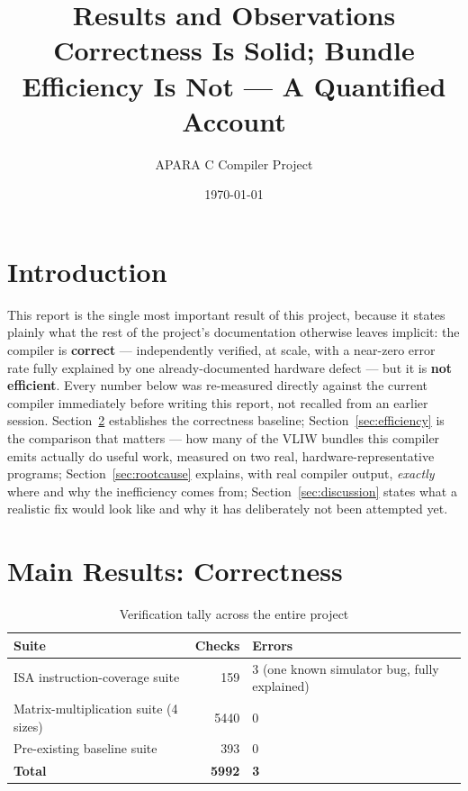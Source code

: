 \documentclass[11pt,a4paper]{article}
\title{\textbf{Results and Observations}\\[2mm]
\large Correctness Is Solid; Bundle Efficiency Is Not --- A Quantified Account}
\author{APARA C Compiler Project}
\date{\today}
\begin{document}
\maketitle
\thispagestyle{fancy}
\vspace{-8mm}

\section{Introduction}

This report is the single most important result of this project, because it states
plainly what the rest of the project's documentation otherwise leaves implicit: the
compiler is \textbf{correct} --- independently verified, at scale, with a near-zero error
rate fully explained by one already-documented hardware defect --- but it is
\textbf{not efficient}. Every number below was re-measured directly against the current
compiler immediately before writing this report, not recalled from an earlier session.
Section~\ref{sec:correctness} establishes the correctness baseline; Section~\ref{sec:efficiency}
is the comparison that matters --- how many of the VLIW bundles this compiler emits
actually do useful work, measured on two real, hardware-representative programs; Section~\ref{sec:rootcause}
explains, with real compiler output, \emph{exactly} where and why the inefficiency comes
from; Section~\ref{sec:discussion} states what a realistic fix would look like and why it
has deliberately not been attempted yet.

\section{Main Results: Correctness}
\label{sec:correctness}

\begin{table}[h]
\centering
\caption{Verification tally across the entire project}
\begin{tabular}{@{}p{6.0cm}rp{4.4cm}@{}}
\toprule
Suite & Checks & Errors \\
\midrule
ISA instruction-coverage suite & 159 & 3 (one known simulator bug, fully explained) \\
Matrix-multiplication suite (4 sizes) & 5440 & 0 \\
Pre-existing baseline suite & 393 & 0 \\
\midrule
\textbf{Total} & \textbf{5992} & \textbf{3} \\
\bottomrule
\end{tabular}
\end{table}
\end{document}
